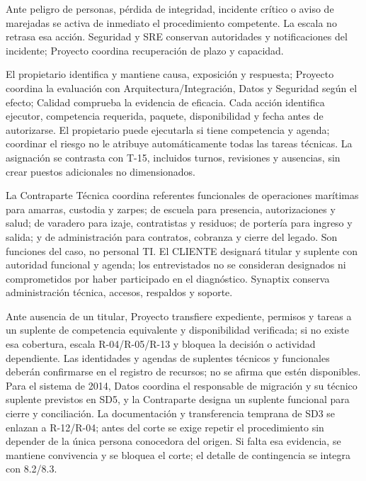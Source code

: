 Ante peligro de personas, pérdida de integridad, incidente crítico o aviso de marejadas se activa de inmediato el procedimiento competente. La escala no retrasa esa acción. Seguridad y SRE conservan autoridades y notificaciones del incidente; Proyecto coordina recuperación de plazo y capacidad.

El propietario identifica y mantiene causa, exposición y respuesta; Proyecto coordina la evaluación con Arquitectura/Integración, Datos y Seguridad según el efecto; Calidad comprueba la evidencia de eficacia. Cada acción identifica ejecutor, competencia requerida, paquete, disponibilidad y fecha antes de autorizarse. El propietario puede ejecutarla si tiene competencia y agenda; coordinar el riesgo no le atribuye automáticamente todas las tareas técnicas. La asignación se contrasta con T-15, incluidos turnos, revisiones y ausencias, sin crear puestos adicionales no dimensionados.

La Contraparte Técnica coordina referentes funcionales de operaciones marítimas para amarras, custodia y zarpes; de escuela para presencia, autorizaciones y salud; de varadero para izaje, contratistas y residuos; de portería para ingreso y salida; y de administración para contratos, cobranza y cierre del legado. Son funciones del caso, no personal TI. El CLIENTE designará titular y suplente con autoridad funcional y agenda; los entrevistados no se consideran designados ni comprometidos por haber participado en el diagnóstico. Synaptix conserva administración técnica, accesos, respaldos y soporte. \parencite[numeral 2.4; numeral 16.1, decisión 22; numeral 17.6]{sd8-c07}

Ante ausencia de un titular, Proyecto transfiere expediente, permisos y tareas a un suplente de competencia equivalente y disponibilidad verificada; si no existe esa cobertura, escala R-04/R-05/R-13 y bloquea la decisión o actividad dependiente. Las identidades y agendas de suplentes técnicos y funcionales deberán confirmarse en el registro de recursos; no se afirma que estén disponibles. Para el sistema de 2014, Datos coordina el responsable de migración y su técnico suplente previstos en SD5, y la Contraparte designa un suplente funcional para cierre y conciliación. La documentación y transferencia temprana de SD3 se enlazan a R-12/R-04; antes del corte se exige repetir el procedimiento sin depender de la única persona conocedora del origen. Si falta esa evidencia, se mantiene convivencia y se bloquea el corte; el detalle de contingencia se integra con 8.2/8.3.

